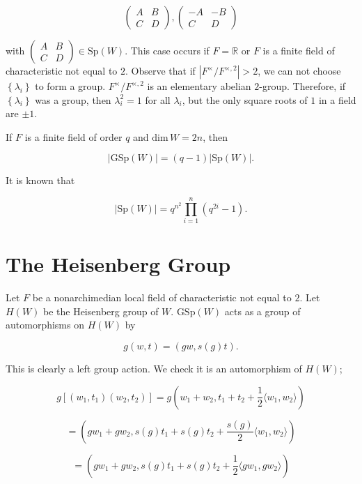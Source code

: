 \documentclass[12pt]{article}
\begin{document}
\[\begin{pmatrix} A & B \\ C & D \end{pmatrix}, \begin{pmatrix} -A & -B \\ C & D
\end{pmatrix}\]

with $\begin{pmatrix} A & B \\ C & D \end{pmatrix} \in \text{Sp}\left(W\right)$.
This case occurs if $F = \mathbb{R}$ or $F$ is a finite field of characteristic
not equal to $2$. Observe that if $\left|F^{\times}/F^{\times,2}\right| > 2$, we
can not choose $\left\{ \lambda_{i} \right\}$ to form a group.
$F^{\times}/F^{\times,2}$ is an elementary abelian $2$-group. Therefore, if
$\left\{ \lambda_{i} \right\}$ was a group, then $\lambda_{i}^{2} = 1$ for all
$\lambda_{i}$, but the only square roots of $1$ in a field are $\pm 1$.

If $F$ is a finite field of order $q$ and $\text{dim} \, W = 2n$, then

\[\left|\text{GSp}\left(W\right)\right| = \left(q - 1\right)
\left|\text{Sp}\left(W\right)\right|.\]

It is known that 

\[\left|\text{Sp}\left(W\right)\right| = q^{n^{2}} \prod_{i = 1}^{n}
\left(q^{2i} - 1\right).\]

\section{The Heisenberg Group}

Let $F$ be a nonarchimedian local field of characteristic not equal to $2$. Let
$H\left(W\right)$ be the Heisenberg group of $W$. $\text{GSp}\left(W\right)$
acts as a group of automorphisms on $H\left(W\right)$ by 

\[g\left(w, t\right) = \left(gw, s\left(g\right) t\right).\]

This is clearly a left group action. We check it is an automorphism of
$H\left(W\right)$; 

\[g\left[\left(w_1, t_1\right) \left(w_2, t_2\right)\right] = g\left(w_1 +
w_2, t_1 + t_2 + \frac{1}{2} \langle w_1, w_2\rangle\right)\] 

\[= \left(gw_1 + gw_2, s\left(g\right)t_1 + s\left(g\right)t_2 +
\frac{s\left(g\right)}{2} \langle w_1, w_2\rangle\right)\] 

\[= \left(gw_1 + gw_2, s\left(g\right)t_1 + s\left(g\right)t_2 + \frac{1}{2}
\langle gw_1, gw_2\rangle\right)\] 
\end{document}
